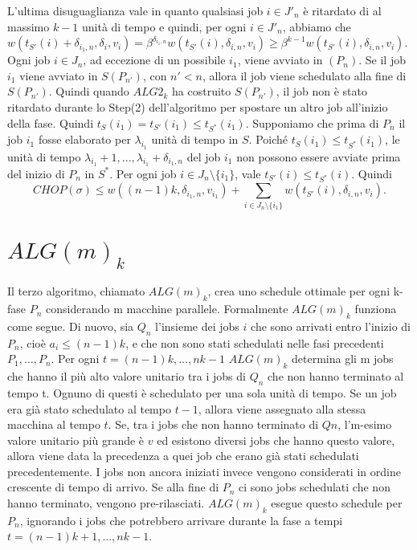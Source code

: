 \documentclass[12pt]{article}
\begin{document}
L'ultima disuguaglianza vale in quanto qualsiasi job $i \in J'_{n}$ è ritardato di al massimo $k - 1$ unità di tempo e quindi, per ogni $i \in J'_{n}$, abbiamo che $w(t_{S'}(i) + \delta_{i_{1}, n}, \delta_{i}, v_{i}) = \beta^{\delta_{i_{1},n}} w(t_{S'}(i), \delta_{i, n}, v_{i}) \geq \beta^{k - 1} w (t_{S'}(i), \delta_{i,n}, v_{i})$. Ogni job $i \in J_{n}$, ad eccezione di un possibile $i_{1}$, viene avviato in $ (P_{n})$. Se il job $i_{1}$ viene avviato in $S(P_{n'})$, con $n' < n$, allora il job viene schedulato alla fine di $S(P_{n'})$. Quindi quando $ALG2_{k}$ ha costruito $S(P_{n'})$, il job non è stato ritardato durante lo Step(2) dell'algoritmo per spostare un altro job all'inizio della fase. Quindi $t_{S}(i_{1}) = t_{S'}(i_{1}) \leq t_{S^{*}}(i_{1})$. Supponiamo che prima di $P_{n}$ il job $i_{1}$ fosse elaborato per $\lambda_{i_{1}}$ unità di tempo in $S$. Poiché $t_{S}(i_{1}) \leq t_{S^{*}} (i_{1})$, le unità di tempo $\lambda_{i_{1}} + 1, ... , \lambda_{i_{1}} + \delta_{i_{1},n}$ del job $i_{1}$ non possono essere avviate prima del inizio di $P_{n}$ in $S^{*}$. Per ogni job $i \in J_{n} \setminus \{i_{1}\}$, vale $t_{S'}(i) \leq t_{S^{*}}(i)$. Quindi
$$CHOP(\sigma) \leq w((n - 1)k, \delta_{i_{1},n}, v_{i_{1}}) + \sum_{i \in J_{n} \setminus \{i_{1}\}} w(t_{S'}(i), \delta_{i,n}, v_{i}).$$


\section{$ALG(m)_{k}$}
Il terzo algoritmo, chiamato $ALG(m)_{k}$, crea uno schedule ottimale per ogni k-fase $P_{n}$ considerando m macchine parallele. Formalmente $ALG(m)_{k}$ funziona come segue. Di nuovo, sia $Q_{n}$ l’insieme dei jobs $i$ che sono arrivati entro l’inizio di $P_{n}$, cioè $a_{i} \leq (n - 1)k$, e che non sono stati schedulati nelle fasi precedenti $P_{1}, … , P_{n}$. Per ogni $t = (n-1)k, … , nk - 1$ $ALG(m)_{k}$ determina gli m jobs che hanno il più alto valore unitario tra i jobs di $Q_{n}$ che non hanno terminato al tempo t. Ognuno di questi è schedulato per una sola unità di tempo. Se un job era già stato schedulato al tempo $t-1$, allora viene assegnato alla stessa macchina al tempo $t$. Se, tra i jobs che non hanno terminato di $Qn$, l’m-esimo valore unitario più grande è $v$ ed esistono diversi jobs che hanno questo valore, allora viene data la precedenza a quei job che erano già stati schedulati precedentemente. I jobs non ancora iniziati invece vengono considerati in ordine crescente di tempo di arrivo. Se alla fine di $P_{n}$ ci sono jobs schedulati che non hanno terminato, vengono pre-rilasciati. $ALG(m)_{k}$ esegue questo schedule per $P_{n}$, ignorando i jobs che potrebbero arrivare durante la fase a tempi $t = (n-1)k + 1, …, nk - 1$.
\end{document}
